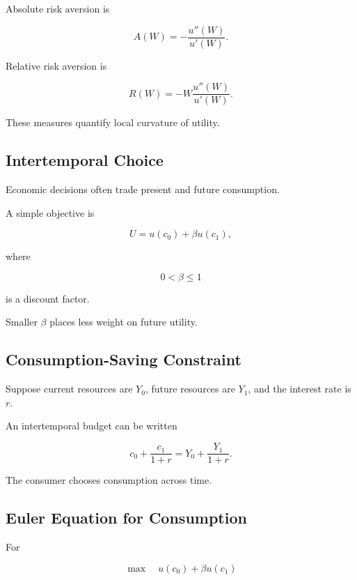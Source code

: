 Absolute risk aversion is

\[
\boxed{
A(W)
=
-
\frac{u''(W)}{u'(W)}.
}
\]

Relative risk aversion is

\[
\boxed{
R(W)
=
-
W
\frac{u''(W)}{u'(W)}.
}
\]

These measures quantify local curvature of utility.

\subsection{Intertemporal Choice}
\label{subsec:intertemporal-choice}

Economic decisions often trade present and future consumption.

A simple objective is

\[
\boxed{
U
=
u(c_0)
+
\beta u(c_1),
}
\]

where

\[
0<\beta\leq1
\]

is a discount factor.

Smaller \(\beta\) places less weight on future utility.

\subsection{Consumption-Saving Constraint}
\label{subsec:consumption-saving}

Suppose current resources are \(Y_0\), future resources are \(Y_1\), and the
interest rate is \(r\).

An intertemporal budget can be written

\[
\boxed{
c_0
+
\frac{c_1}{1+r}
=
Y_0
+
\frac{Y_1}{1+r}.
}
\]

The consumer chooses consumption across time.

\subsection{Euler Equation for Consumption}
\label{subsec:consumption-euler-equation}

For

\[
\max
\quad
u(c_0)+\beta u(c_1)
\]

